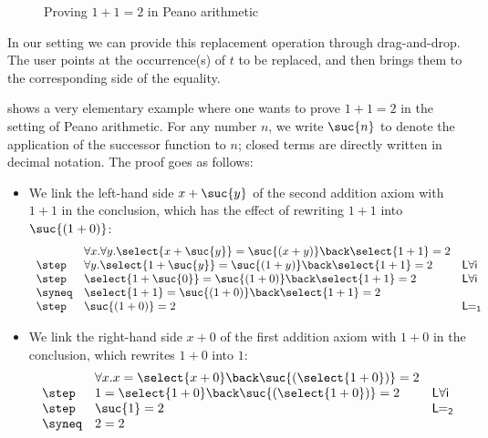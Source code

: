 \begin{figure*}
  \begin{center}
  \end{center}
  \caption{Proving $1 + 1 = 2$ in Peano arithmetic}
\end{figure*}

In our setting we can provide this replacement operation through
drag-and-drop. The user points at the occurrence(s) of $t$ to be
replaced, and then brings them to the corresponding side of the
equality.

 shows a very elementary example where one wants to
prove $1+1=2$ in the setting of Peano arithmetic. For any number $n$, we write
$\suc{n}$ to denote the application of the successor function to $n$; closed
terms are directly written in decimal notation. The proof goes as
follows:
\begin{itemize}
  \item We link the left-hand side $x + \suc{y}$ of the second addition axiom with $1 + 1$ in the conclusion, which has the effect of rewriting $1 + 1$ into $\suc{(1 + 0)}$:
    $$
      \begin{array}{lll}
        & \forall x. \forall y. \select{x + \suc{y}} = \suc{(x + y)} \back \select{1 + 1} = 2 & \\
        \step & \forall y. \select{1 + \suc{y}} = \suc{(1 + y)} \back \select{1 + 1} = 2 &\mathsf{L\forall i} \\
        \step & \select{1 + \suc{0}} = \suc{(1 + 0)} \back \select{1 + 1} = 2 &\mathsf{L\forall i} \\
        \syneq & \select{1 + 1} = \suc{(1 + 0)} \back \select{1 + 1} = 2 & \\
        \step & \suc{(1 + 0)} = 2 &\mathsf{L\!\!=_1}
      \end{array}
    $$
  \item We link the right-hand side $x + 0$ of the first addition axiom with $1 + 0$ in the conclusion, which rewrites $1 + 0$ into $1$:
    $$
      \begin{array}{lll}
        & \forall x. x = \select{x + 0} \back \suc{(\select{1 + 0})} = 2 & \\
        \step & 1 = \select{1 + 0} \back \suc{(\select{1 + 0})} = 2 &\mathsf{L\forall i} \\
        \step & \suc{1} = 2 &\mathsf{L\!\!=_2} \\
        \syneq & 2 = 2 &
      \end{array}
    $$
\end{itemize}

